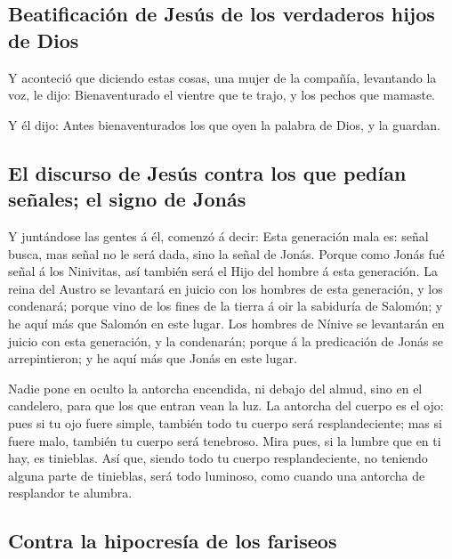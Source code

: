 \hypertarget{beatificaciuxf3n-de-jesuxfas-de-los-verdaderos-hijos-de-dios}{%
\subsection{Beatificación de Jesús de los verdaderos hijos de
Dios}\label{beatificaciuxf3n-de-jesuxfas-de-los-verdaderos-hijos-de-dios}}

 Y aconteció que diciendo estas cosas, una mujer de la
compañía, levantando la voz, le dijo: Bienaventurado el vientre que te
trajo, y los pechos que mamaste.

 Y él dijo: Antes bienaventurados los que oyen la palabra
de Dios, y la guardan.

\hypertarget{el-discurso-de-jesuxfas-contra-los-que-peduxedan-seuxf1ales-el-signo-de-jonuxe1s}{%
\subsection{El discurso de Jesús contra los que pedían señales; el signo
de
Jonás}\label{el-discurso-de-jesuxfas-contra-los-que-peduxedan-seuxf1ales-el-signo-de-jonuxe1s}}

 Y juntándose las gentes á él, comenzó á decir: Esta
generación mala es: señal busca, mas señal no le será dada, sino la
señal de Jonás.  Porque como Jonás fué señal á los
Ninivitas, así también será el Hijo del hombre á esta generación.
 La reina del Austro se levantará en juicio con los
hombres de esta generación, y los condenará; porque vino de los fines de
la tierra á oir la sabiduría de Salomón; y he aquí más que Salomón en
este lugar.  Los hombres de Nínive se levantarán en
juicio con esta generación, y la condenarán; porque á la predicación de
Jonás se arrepintieron; y he aquí más que Jonás en este lugar.

 Nadie pone en oculto la antorcha encendida, ni debajo
del almud, sino en el candelero, para que los que entran vean la luz.
 La antorcha del cuerpo es el ojo: pues si tu ojo fuere
simple, también todo tu cuerpo será resplandeciente; mas si fuere malo,
también tu cuerpo será tenebroso.  Mira pues, si la
lumbre que en ti hay, es tinieblas.  Así que, siendo todo
tu cuerpo resplandeciente, no teniendo alguna parte de tinieblas, será
todo luminoso, como cuando una antorcha de resplandor te alumbra.

\hypertarget{contra-la-hipocresuxeda-de-los-fariseos}{%
\subsection{Contra la hipocresía de los
fariseos}\label{contra-la-hipocresuxeda-de-los-fariseos}}

